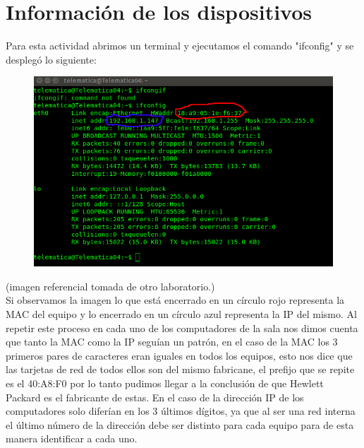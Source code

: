 \documentclass{udpreport}
\begin{document}
	\section{Información de los dispositivos}
		Para esta actividad abrimos un terminal y ejecutamos el comando "ifconfig" y se desplegó lo siguiente:\\
		\begin{figure}[h]
    		\centering
    	\includegraphics[width=\textwidth]{Terminal.png}
		\end{figure}
		(imagen referencial tomada de otro laboratorio.)\\
		Si observamos la imagen lo que está encerrado en un círculo rojo representa la MAC del equipo y lo encerrado en un
		círculo azul representa la IP del mismo. Al repetir este proceso en cada uno de los computadores de la sala nos    
		dimos cuenta que tanto la MAC como la IP seguían un patrón, en el caso de la MAC los 3 primeros pares de caracteres
		eran iguales en todos los equipos, esto nos dice que las tarjetas de red de todos ellos son del mismo fabricane,      
		el prefijo que se repite es el 40:A8:F0 por lo tanto pudimos llegar a la conclusión de que Hewlett Packard es el      
		fabricante de estas. En el caso de la dirección IP de los computadores solo diferían en los 3 últimos dígitos, ya     
		que al ser una red interna el último número de la dirección debe ser distinto para cada equipo para de esta manera    
		identificar a cada uno.
\end{document}
